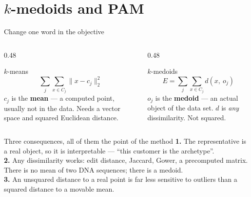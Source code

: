 \documentclass[aspectratio=169]{beamer}
\begin{document}
\section[$k$-medoids]{$k$-medoids and PAM}
\label{sec:medoid}

\begin{frame}[shrink=8]{Change one word in the objective}
  \begin{columns}[T]
    \begin{column}{0.48\textwidth}
      \begin{block}{$k$-means}
        \[ \sum_{j}\sum_{x\in C_j}\lVert x - c_j\rVert_2^2 \]
        \small $c_j$ is the \textbf{mean} --- a computed point, usually not
        in the data. Needs a vector space and squared Euclidean distance.
      \end{block}
    \end{column}
    \begin{column}{0.48\textwidth}
      \begin{exampleblock}{$k$-medoids}
        \[ E = \sum_{j}\sum_{x\in C_j} d(x,\ o_j) \]
        \small $o_j$ is the \textbf{medoid} --- an actual object of the data
        set. $d$ is \emph{any} dissimilarity. Not squared.
      \end{exampleblock}
    \end{column}
  \end{columns}
  \vspace{0.3em}
  \begin{block}{Three consequences, all of them the point of the method}
    \small
    \textbf{1.} The representative is a real object, so it is interpretable
    --- ``this customer is the archetype''. \\
    \textbf{2.} Any dissimilarity works: edit distance, Jaccard, Gower, a
    precomputed matrix. There is no mean of two DNA sequences; there is a
    medoid. \\
    \textbf{3.} An unsquared distance to a real point is far less sensitive
    to outliers than a squared distance to a movable mean.
  \end{block}
\end{frame}
\end{document}

